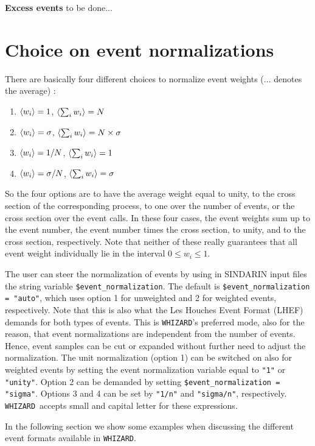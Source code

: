 \documentclass[12pt]{book}
\newcommand{\ttt}[1]{\texttt{#1}}
\newcommand{\whizard}{\texttt{WHIZARD}}
\begin{document}
{\bf Excess events} to be done...


\section{Choice on event normalizations}

There are basically four different choices to normalize event weights
($\ldots$ denotes the average) :
\begin{enumerate}
\item $\mathinner{\langle{w_i}\rangle} = 1$, \qquad\qquad $\Braket{\sum_i w_i} = N$
\item $\mathinner{\langle{w_i}\rangle} = \sigma$, \qquad\qquad $\Braket{\sum_i w_i} = N
  \times \sigma$
\item $\mathinner{\langle{w_i}\rangle} = 1/N$, \quad\qquad $\Braket{\sum_i w_i} = 1$
\item $\mathinner{\langle{w_i}\rangle} = \sigma/N$, \quad\qquad $\Braket{\sum_i w_i} = \sigma$
\end{enumerate}
So the four options are to have the average weight equal to unity, to
the cross section of the corresponding process, to one over the number
of events, or the cross section over the event calls. In these four
cases, the event weights sum up to the event number, the event number
times the cross section, to unity, and to the cross section,
respectively. Note that neither of these really guarantees that all
event weight individually lie in the interval $0 \leq w_i \leq 1$. 

The user can steer the normalization of events by using in SINDARIN
input files the string variable \ttt{\$event\_normalization}. The default is
\ttt{\$event\_normalization = "auto"}, which uses option 1 for
unweighted and 2 for weighted events, respectively. Note that this is
also what the Les Houches Event Format (LHEF) demands for both types
of events. This is \whizard's preferred mode, also for the reason, that
event normalizations are independent from the number of events. Hence,
event samples can be cut or expanded without further need to adjust
the normalization. The unit normalization (option 1) can be switched
on also for weighted events by setting the event normalization
variable equal to \ttt{"1"} or \ttt{"unity"}. Option 2 can be demanded
by setting \ttt{\$event\_normalization = "sigma"}. Options 3 and 4 can
be set by \ttt{"1/n"} and \ttt{"sigma/n"}, respectively. \whizard\
accepts small and capital letter for these expressions. 

In the following section we show some examples when discussing the
different event formats available in \whizard.
\end{document}
